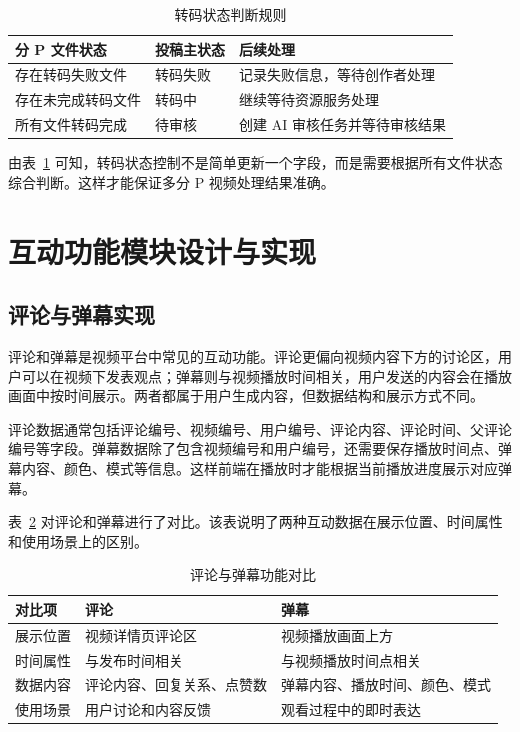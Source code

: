 \begin{table}[htbp]
  \centering
  \caption{转码状态判断规则}
  \label{tab:transcode-status-rule}
  \begin{tabular}{p{}p{}p{}}
    \hline
    \textbf{分 P 文件状态} & \textbf{投稿主状态} & \textbf{后续处理} \\
    \hline
    存在转码失败文件 & 转码失败 & 记录失败信息，等待创作者处理 \\
    存在未完成转码文件 & 转码中 & 继续等待资源服务处理 \\
    所有文件转码完成 & 待审核 & 创建 AI 审核任务并等待审核结果 \\
    \hline
  \end{tabular}
\end{table}

由表~\ref{tab:transcode-status-rule} 可知，转码状态控制不是简单更新一个字段，而是需要根据所有文件状态综合判断。这样才能保证多分 P 视频处理结果准确。

\section{互动功能模块设计与实现}
\label{sec:interaction-implementation}

\subsection{评论与弹幕实现}
\label{subsec:comment-danmu-implementation}

评论和弹幕是视频平台中常见的互动功能。评论更偏向视频内容下方的讨论区，用户可以在视频下发表观点；弹幕则与视频播放时间相关，用户发送的内容会在播放画面中按时间展示。两者都属于用户生成内容，但数据结构和展示方式不同。

评论数据通常包括评论编号、视频编号、用户编号、评论内容、评论时间、父评论编号等字段。弹幕数据除了包含视频编号和用户编号，还需要保存播放时间点、弹幕内容、颜色、模式等信息。这样前端在播放时才能根据当前播放进度展示对应弹幕。

表~\ref{tab:comment-danmu-compare} 对评论和弹幕进行了对比。该表说明了两种互动数据在展示位置、时间属性和使用场景上的区别。

\begin{table}[htbp]
  \centering
  \caption{评论与弹幕功能对比}
  \label{tab:comment-danmu-compare}
  \begin{tabular}{p{}p{}p{}}
    \hline
    \textbf{对比项} & \textbf{评论} & \textbf{弹幕} \\
    \hline
    展示位置 & 视频详情页评论区 & 视频播放画面上方 \\
    时间属性 & 与发布时间相关 & 与视频播放时间点相关 \\
    数据内容 & 评论内容、回复关系、点赞数 & 弹幕内容、播放时间、颜色、模式 \\
    使用场景 & 用户讨论和内容反馈 & 观看过程中的即时表达 \\
    \hline
  \end{tabular}
\end{table}

